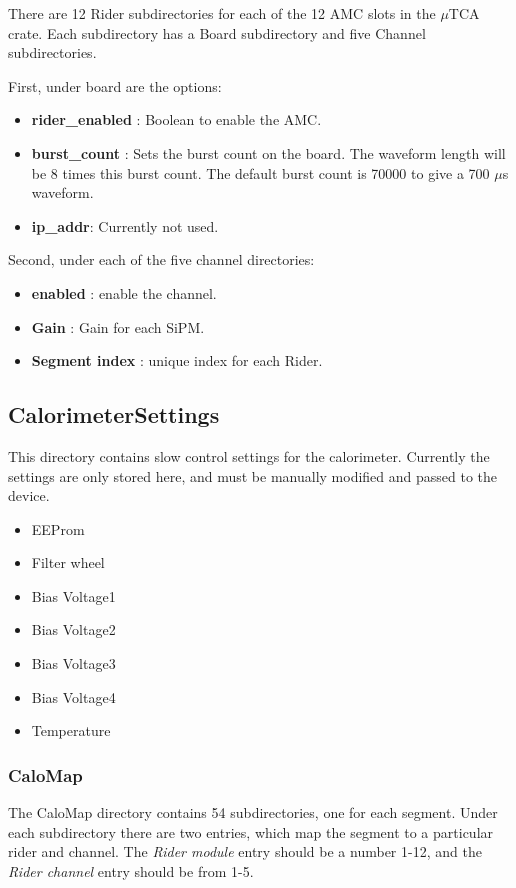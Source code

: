 There are 12 Rider subdirectories for each of the 12 AMC slots in the $\mu$TCA crate. Each subdirectory has a Board subdirectory and five Channel subdirectories. 

First, under board are the options:

\begin{itemize}
\item {\bf rider\_enabled} : Boolean to enable the AMC.
\item {\bf burst\_count} : Sets the burst count on the board. The waveform length will be 8 times this burst count. The default burst count is 70000 to give a 700 $\mu$s waveform.
\item {\bf ip\_addr}: Currently not used.
\end{itemize}

Second, under each of the five channel directories:

\begin{itemize}
\item {\bf enabled} : enable the channel.
\item {\bf Gain} : Gain for each SiPM.
\item {\bf Segment index} : unique index for each Rider.
\end{itemize}

\subsection{CalorimeterSettings}

This directory contains slow control settings for the calorimeter. Currently the settings are only stored here, and must be manually modified and passed to the device.

\begin{itemize}
\item EEProm
\item Filter wheel
\item Bias Voltage1
\item Bias Voltage2
\item Bias Voltage3
\item Bias Voltage4
\item Temperature
\end{itemize}

\subsubsection{CaloMap}

The CaloMap directory contains 54 subdirectories, one for each segment. Under each subdirectory there are two entries, which map the segment to a particular rider and channel. The \emph{Rider module} entry should be a number 1-12, and the \emph{Rider channel} entry should be from 1-5.

